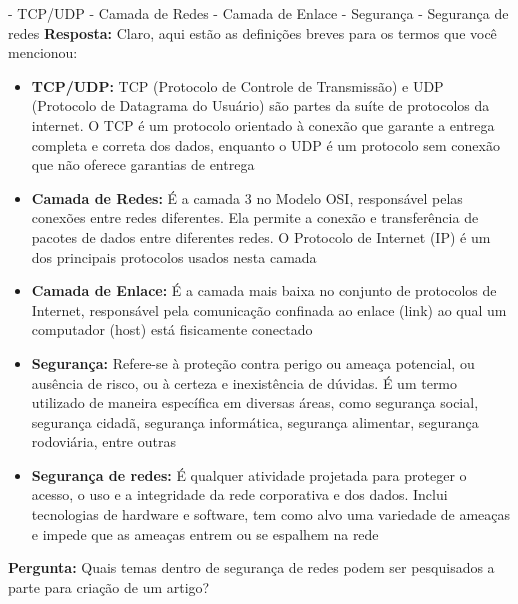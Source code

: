 \documentclass[10pt,conference,twocolumn]{article}
\begin{document}
- TCP/UDP\newline
- Camada de Redes\newline
- Camada de Enlace\newline
- Segurança\newline
- Segurança de redes\newline
\textbf{Resposta:}\newline
Claro, aqui estão as definições breves para os termos que você mencionou:\newline
\begin{itemize}
    \item \textbf{TCP/UDP:} TCP (Protocolo de Controle de Transmissão) e UDP (Protocolo de Datagrama do Usuário) são partes da suíte de protocolos da internet. O TCP é um protocolo orientado à conexão que garante a entrega completa e correta dos dados, enquanto o UDP é um protocolo sem conexão que não oferece garantias de entrega
    \item \textbf{Camada de Redes:} É a camada 3 no Modelo OSI, responsável pelas conexões entre redes diferentes. Ela permite a conexão e transferência de pacotes de dados entre diferentes redes. O Protocolo de Internet (IP) é um dos principais protocolos usados nesta camada
    \item \textbf{Camada de Enlace:} É a camada mais baixa no conjunto de protocolos de Internet, responsável pela comunicação confinada ao enlace (link) ao qual um computador (host) está fisicamente conectado
    \item \textbf{Segurança:} Refere-se à proteção contra perigo ou ameaça potencial, ou ausência de risco, ou à certeza e inexistência de dúvidas. É um termo utilizado de maneira específica em diversas áreas, como segurança social, segurança cidadã, segurança informática, segurança alimentar, segurança rodoviária, entre outras
    \item \textbf{Segurança de redes:} É qualquer atividade projetada para proteger o acesso, o uso e a integridade da rede corporativa e dos dados. Inclui tecnologias de hardware e software, tem como alvo uma variedade de ameaças e impede que as ameaças entrem ou se espalhem na rede
\end{itemize}
\textbf{Pergunta:}\newline
Quais temas dentro de segurança de redes podem ser pesquisados a parte para criação de um artigo?\newline
\end{document}

